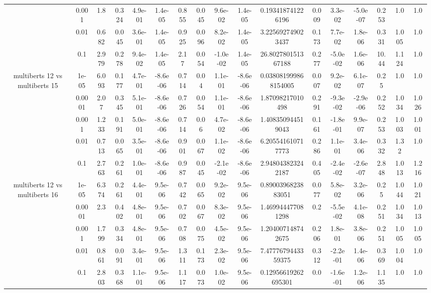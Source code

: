 \begin{tabular}{|c|c|c|c|c|c|c|c|c|c|c|c|c|c|c|c|c|}
 & 0.001 & 1.8 & 0.324 & 4.9e-01 & 1.4e-05 & 0.855 & 0.045 & 9.6e-02 & 1.4e-05 & 0.193418741226196 & 0.009 & 3.3e-02 & -5.0e-07 & 0.253 & 1.0 & 1.0 \\
 & 0.01 & 0.682 & 0.045 & 3.6e-01 & 1.4e-05 & 0.925 & 0.096 & 8.2e-02 & 1.4e-05 & 3.225692749023437 & 0.173 & 7.7e-02 & 1.8e-06 & 0.331 & 1.005 & 1.0 \\
 & 0.1 & 2.979 & 0.278 & 9.4e-02 & 1.4e-05 & 2.17 & 0.054 & -1.0e-02 & 1.4e-05 & 26.802780151367188 & 0.277 & -5.0e-02 & 1.6e-06 & 10.44 & 1.124 & 1.0 \\
\hline
\multirow{5}{*}{multiberts 12 vs multiberts 15} & 1e-05 & 6.093 & 0.177 & 4.7e-01 & -8.6e-06 & 0.714 & 0.04 & 1.1e-01 & -8.6e-06 & 0.038081999868154005 & 0.007 & 9.2e-02 & 6.1e-07 & 0.25 & 1.0 & 1.0 \\
 & 0.0001 & 2.07 & 0.345 & 5.1e-01 & -8.6e-06 & 0.726 & 0.054 & 1.1e-01 & -8.6e-06 & 1.87098217010498 & 0.291 & -9.3e-02 & -2.9e-06 & 0.252 & 1.034 & 1.026 \\
 & 0.001 & 1.233 & 0.191 & 5.0e-01 & -8.6e-06 & 0.714 & 0.06 & 4.7e-02 & -8.6e-06 & 1.408350944519043 & 0.161 & -1.8e-01 & 9.9e-07 & 0.253 & 1.003 & 1.001 \\
 & 0.01 & 0.713 & 0.065 & 3.5e-01 & -8.6e-06 & 0.901 & 0.067 & 1.1e-02 & -8.6e-06 & 6.205541610717773 & 0.286 & 1.1e-01 & 3.4e-06 & 0.332 & 1.32 & 1.0 \\
 & 0.1 & 2.763 & 0.261 & 1.0e-01 & -8.6e-06 & 0.987 & 0.045 & -2.1e-02 & -8.6e-06 & 2.948043823242187 & 0.405 & -2.4e-02 & -2.6e-07 & 2.848 & 1.013 & 1.216 \\
\hline
\multirow{5}{*}{multiberts 12 vs multiberts 16} & 1e-05 & 6.374 & 0.261 & 4.4e-01 & 9.5e-06 & 0.742 & 0.065 & 9.2e-02 & 9.5e-06 & 0.8900396823883051 & 0.077 & 5.8e-02 & 3.2e-06 & 0.25 & 1.044 & 1.021 \\
 & 0.0001 & 2.3 & 0.402 & 4.8e-01 & 9.5e-06 & 0.702 & 0.067 & 8.3e-02 & 9.5e-06 & 1.469944477081298 & 0.2 & -5.5e-02 & 4.1e-08 & 0.251 & 1.034 & 1.013 \\
 & 0.001 & 1.799 & 0.334 & 4.8e-01 & 9.5e-06 & 0.708 & 0.075 & 4.5e-02 & 9.5e-06 & 1.204007148742675 & 0.206 & 1.8e-01 & 3.8e-06 & 0.251 & 1.005 & 1.005 \\
 & 0.01 & 0.861 & 0.091 & 3.4e-01 & 9.5e-06 & 1.311 & 0.173 & 2.3e-02 & 9.5e-06 & 7.4777679443359375 & 0.312 & -2.2e-01 & 1.4e-06 & 0.369 & 1.004 & 1.0 \\
 & 0.1 & 2.803 & 0.368 & 1.1e-01 & 9.5e-06 & 1.117 & 0.073 & 1.0e-02 & 9.5e-06 & 0.12956619262695301 & 0.0 & -1.6e-01 & 1.2e-06 & 1.135 & 1.0 & 1.0 \\

\end{tabular}
